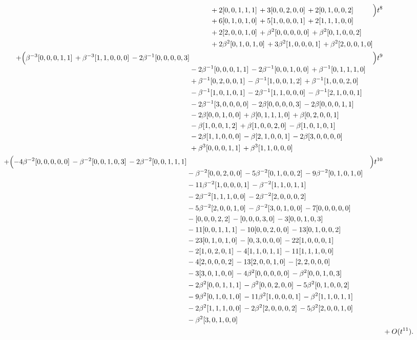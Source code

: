 \documentclass[10pt]{article}
\begin{document}
\[\begin{aligned}
\begin{aligned}[t]
  &{}+2[0,0,1,1,1]\,+3[0,0,2,0,0]\,+2[0,1,0,0,2] \\
  &{}+6[0,1,0,1,0]\,+5[1,0,0,0,1]\,+2[1,1,1,0,0] \\
  &{}+2[2,0,0,1,0]\,+\beta^{2}[0,0,0,0,0]\,+\beta^{2}[0,1,0,0,2] \\
  &{}+2\beta^{2}[0,1,0,1,0]\,+3\beta^{2}[1,0,0,0,1]\,+\beta^{2}[2,0,0,1,0]\end{aligned}\Bigr)t^{8} \\
  + \Bigl(\begin{aligned}[t]\beta^{-3}[0,0,0,1,1]\,+\beta^{-3}[1,1,0,0,0]\,-2\beta^{-1}[0,0,0,0,3] \\
  &{}-2\beta^{-1}[0,0,0,1,1]\,-2\beta^{-1}[0,0,1,0,0]\,+\beta^{-1}[0,1,1,1,0] \\
  &{}+\beta^{-1}[0,2,0,0,1]\,-\beta^{-1}[1,0,0,1,2]\,+\beta^{-1}[1,0,0,2,0] \\
  &{}-\beta^{-1}[1,0,1,0,1]\,-2\beta^{-1}[1,1,0,0,0]\,-\beta^{-1}[2,1,0,0,1] \\
  &{}-2\beta^{-1}[3,0,0,0,0]\,-2\beta[0,0,0,0,3]\,-2\beta[0,0,0,1,1] \\
  &{}-2\beta[0,0,1,0,0]\,+\beta[0,1,1,1,0]\,+\beta[0,2,0,0,1] \\
  &{}-\beta[1,0,0,1,2]\,+\beta[1,0,0,2,0]\,-\beta[1,0,1,0,1] \\
  &{}-2\beta[1,1,0,0,0]\,-\beta[2,1,0,0,1]\,-2\beta[3,0,0,0,0] \\
  &{}+\beta^{3}[0,0,0,1,1]\,+\beta^{3}[1,1,0,0,0]\end{aligned}\Bigr)t^{9} \\
  + \Bigl(\begin{aligned}[t]-4\beta^{-2}[0,0,0,0,0]\,-\beta^{-2}[0,0,1,0,3]\,-2\beta^{-2}[0,0,1,1,1] \\
  &{}-\beta^{-2}[0,0,2,0,0]\,-5\beta^{-2}[0,1,0,0,2]\,-9\beta^{-2}[0,1,0,1,0] \\
  &{}-11\beta^{-2}[1,0,0,0,1]\,-\beta^{-2}[1,1,0,1,1] \\
  &{}-2\beta^{-2}[1,1,1,0,0]\,-2\beta^{-2}[2,0,0,0,2] \\
  &{}-5\beta^{-2}[2,0,0,1,0]\,-\beta^{-2}[3,0,1,0,0]\,-7[0,0,0,0,0] \\
  &{}-[0,0,0,2,2]\,-[0,0,0,3,0]\,-3[0,0,1,0,3] \\
  &{}-11[0,0,1,1,1]\,-10[0,0,2,0,0]\,-13[0,1,0,0,2] \\
  &{}-23[0,1,0,1,0]\,-[0,3,0,0,0]\,-22[1,0,0,0,1] \\
  &{}-2[1,0,2,0,1]\,-4[1,1,0,1,1]\,-11[1,1,1,0,0] \\
  &{}-4[2,0,0,0,2]\,-13[2,0,0,1,0]\,-[2,2,0,0,0] \\
  &{}-3[3,0,1,0,0]\,-4\beta^{2}[0,0,0,0,0]\,-\beta^{2}[0,0,1,0,3] \\
  &{}-2\beta^{2}[0,0,1,1,1]\,-\beta^{2}[0,0,2,0,0]\,-5\beta^{2}[0,1,0,0,2] \\
  &{}-9\beta^{2}[0,1,0,1,0]\,-11\beta^{2}[1,0,0,0,1]\,-\beta^{2}[1,1,0,1,1] \\
  &{}-2\beta^{2}[1,1,1,0,0]\,-2\beta^{2}[2,0,0,0,2]\,-5\beta^{2}[2,0,0,1,0] \\
  &{}-\beta^{2}[3,0,1,0,0]\end{aligned}\Bigr)t^{10} \\
  &+ O(t^{11}).
\end{aligned}
\]
\end{document}
